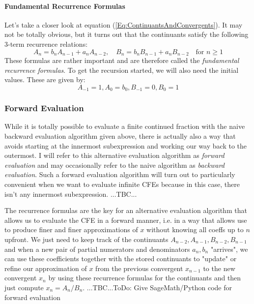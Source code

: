 \paragraph{Fundamental Recurrence Formulas}
Let's take a closer look at equation (\ref{Eq:ContinuantsAndConvergents}). It may not be totally obvious, but it turns out that the continuants satisfy the following 3-term recurrence relations:
\begin{equation}
A_n = b_n A_{n-1} + a_n A_{n-2}, \quad
B_n = b_n B_{n-1} + a_n B_{n-2}  \quad
\text{for }  n \geq 1
\end{equation}
These formulas are rather important and are therefore called the \emph{fundamental recurrence formulas}.
To get the recursion started, we will also need the initial values. These are given by:
\begin{equation}
A_{-1} = 1, A_0 = b_0, B_{-1} = 0, B_0 = 1
\end{equation}




\subsubsection{Forward Evaluation}
While it is totally possible to evaluate a finite continued fraction with the naive backward evaluation algorithm given above, there is actually also a way that avoids starting at the innermost subexpression and working our way back to the outermost. I will refer to this alternative evaluation algorithm as \emph{forward evaluation} and may occasionally refer to the naive algorithm as \emph{backward evaluation}. Such a forward evaluation algorithm will turn out to particularly convenient when we want to evaluate infinite CFEs because in this case, there isn't any innermost subexpression. ...TBC...





The recurrence formulas are the key for an alternative evaluation algorithm that allows us to evaluate the CFE in a forward manner, i.e. in a way that allows use to produce finer and finer approximations of $x$ without knowing all coeffs up to $n$ upfront. We just need to keep track of the continuants $A_{n-2}, A_{n-1}, B_{n-2}, B_{n-1}$ and when a new pair of partial numerators and denominators $a_n, b_n$ "arrives", we can use these coefficients together with the stored continuants to "update" or refine our approximation of $x$ from the previous convergent $x_{n-1}$ to the new convergent $x_n$ by using these recurrence formulas for the continuants and then just compute $x_n = A_n/B_n$. ...TBC...ToDo: Give SageMath/Python code for forward evaluation


